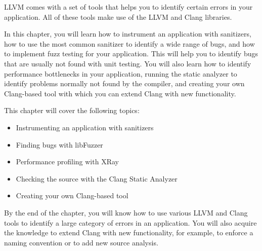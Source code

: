 LLVM comes with a set of tools that helps you to identify certain errors in your application. All of these tools make use of the LLVM and Clang libraries.\par

In this chapter, you will learn how to instrument an application with sanitizers, how to use the most common sanitizer to identify a wide range of bugs, and how to implement fuzz testing for your application. This will help you to identify bugs that are usually not found with unit testing. You will also learn how to identify performance bottlenecks in your application, running the static analyzer to identify problems normally not found by the compiler, and creating your own Clang-based tool with which you can extend Clang with new functionality.\par

This chapter will cover the following topics:\par

\begin{itemize}
\item Instrumenting an application with sanitizers
\item Finding bugs with libFuzzer
\item Performance profiling with XRay
\item Checking the source with the Clang Static Analyzer
\item Creating your own Clang-based tool
\end{itemize}

By the end of the chapter, you will know how to use various LLVM and Clang tools to identify a large category of errors in an application. You will also acquire the knowledge to extend Clang with new functionality, for example, to enforce a naming convention or to add new source analysis.\par







